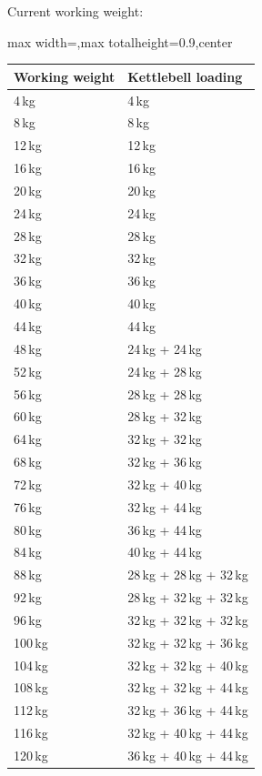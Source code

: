\documentclass[11pt,a4paper]{article}
\newcommand{\tablearraystretch}{1.15}
\begin{document}
Current working weight:

\begin{center}
\renewcommand{\arraystretch}{\tablearraystretch}
\begin{adjustbox}{max width=\linewidth,max totalheight=0.9\textheight,center}
\begin{tabular}{ll}
\toprule
Working weight & Kettlebell loading \\
\midrule
4\,kg & 4\,kg \\
8\,kg & 8\,kg \\
12\,kg & 12\,kg \\
16\,kg & 16\,kg \\
20\,kg & 20\,kg \\
24\,kg & 24\,kg \\
28\,kg & 28\,kg \\
32\,kg & 32\,kg \\
36\,kg & 36\,kg \\
40\,kg & 40\,kg \\
44\,kg & 44\,kg \\
48\,kg & 24\,kg + 24\,kg \\
52\,kg & 24\,kg + 28\,kg \\
56\,kg & 28\,kg + 28\,kg \\
60\,kg & 28\,kg + 32\,kg \\
64\,kg & 32\,kg + 32\,kg \\
68\,kg & 32\,kg + 36\,kg \\
72\,kg & 32\,kg + 40\,kg \\
76\,kg & 32\,kg + 44\,kg \\
80\,kg & 36\,kg + 44\,kg \\
84\,kg & 40\,kg + 44\,kg \\
88\,kg & 28\,kg + 28\,kg + 32\,kg \\
92\,kg & 28\,kg + 32\,kg + 32\,kg \\
96\,kg & 32\,kg + 32\,kg + 32\,kg \\
100\,kg & 32\,kg + 32\,kg + 36\,kg \\
104\,kg & 32\,kg + 32\,kg + 40\,kg \\
108\,kg & 32\,kg + 32\,kg + 44\,kg \\
112\,kg & 32\,kg + 36\,kg + 44\,kg \\
116\,kg & 32\,kg + 40\,kg + 44\,kg \\
120\,kg & 36\,kg + 40\,kg + 44\,kg \\
\bottomrule
\end{tabular}
\end{adjustbox}
\renewcommand{\arraystretch}{1}
\end{center}
\end{document}
